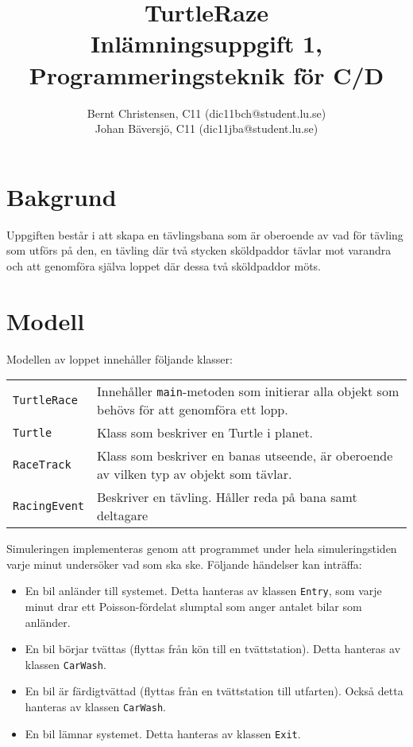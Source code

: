 \documentclass[a4paper]{article}
\title{TurtleRaze \\
	Inlämningsuppgift 1, Programmeringsteknik för C/D}
\author{Bernt Christensen, C11 (dic11bch@student.lu.se)\\
Johan Bäversjö, C11 (dic11jba@student.lu.se)}
\newcommand{\code}[1]{\texttt{#1}} %
\begin{document}

\maketitle                    %
\section{Bakgrund}
Uppgiften består i att skapa en tävlingsbana som är oberoende av vad för tävling som utförs på den, en tävling där två stycken sköldpaddor tävlar mot varandra och att genomföra själva loppet där dessa två sköldpaddor möts. 

\section{Modell}
Modellen av loppet innehåller följande klasser:

\begin{tabular}{lp{8cm}}
\code{TurtleRace} & Innehåller \code{main}-metoden som initierar alla objekt som behövs för att genomföra ett lopp. \\
\code{Turtle} & Klass som beskriver en Turtle i planet. \\
\code{RaceTrack} & Klass som beskriver en banas utseende, är oberoende av vilken typ av objekt som tävlar. \\
\code{RacingEvent} & Beskriver en tävling. Håller reda på bana samt deltagare \\

\end{tabular}

\vspace{\baselineskip}
Simuleringen implementeras genom att programmet under hela simuleringstiden varje minut undersöker vad som ska ske. Följande händelser kan inträffa:

\begin{itemize}
\item En bil anländer till systemet. Detta hanteras av klassen \code{Entry}, som varje minut drar ett Poisson-fördelat slumptal som anger antalet bilar som anländer.
\item En bil börjar tvättas (flyttas från kön till en tvättstation). Detta hanteras av klassen \code{CarWash}.
\item En bil är färdigtvättad (flyttas från en tvättstation till utfarten). Också detta hanteras av klassen \code{CarWash}.
\item En bil lämnar systemet. Detta hanteras av klassen \code{Exit}.
\end{itemize}
\end{document}
